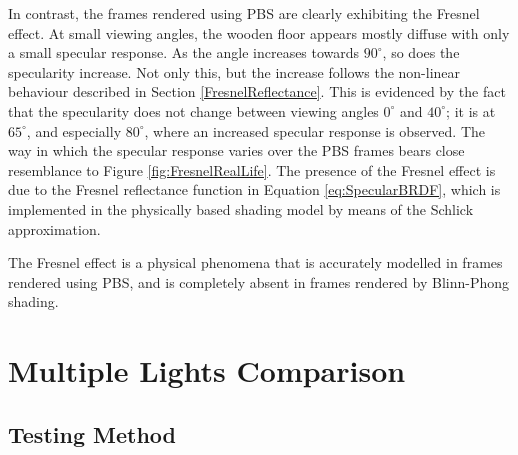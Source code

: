 In contrast, the frames rendered using PBS are clearly exhibiting the Fresnel effect. At small viewing angles, the wooden floor appears mostly diffuse with only a small specular response. As the angle increases towards \begin{math}90^{\circ}\end{math}, so does the specularity increase. Not only this, but the increase follows the non-linear behaviour described in Section \ref{FresnelReflectance}. This is evidenced by the fact that the specularity does not change between viewing angles \begin{math}0^{\circ}\end{math} and \begin{math}40^{\circ}\end{math}; it is at \begin{math}65^{\circ}\end{math}, and especially \begin{math}80^{\circ}\end{math}, where an increased specular response is observed. The way in which the specular response varies over the PBS frames bears close resemblance to Figure \ref{fig:FresnelRealLife}. The presence of the Fresnel effect is due to the Fresnel reflectance function in Equation \ref{eq:SpecularBRDF}, which is implemented in the physically based shading model by means of the Schlick approximation.

The Fresnel effect is a physical phenomena that is accurately modelled in frames rendered using PBS, and is completely absent in frames rendered by Blinn-Phong shading.

\section{Multiple Lights Comparison} \label{MultipleLightsComparison}

\subsection{Testing Method}

